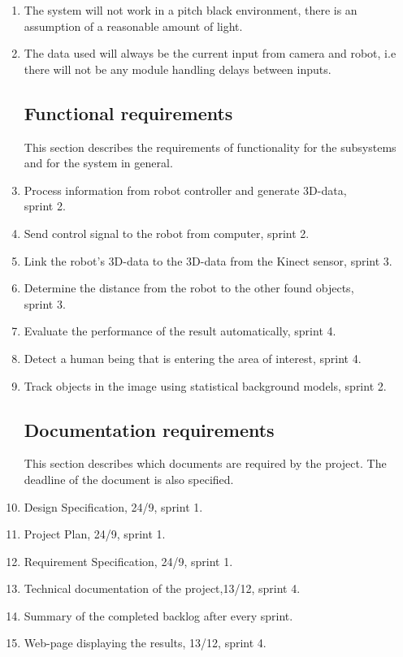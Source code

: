\documentclass[10pt,a4paper]{article}
\begin{document}
\begin{enumerate}
\item The system will not work in a pitch black environment, there is an assumption of a reasonable amount of light.

\item The data used will always be the current input from camera and robot, i.e there will not be any module handling delays between inputs.

\subsection{Functional requirements}
This section describes the requirements of functionality for the subsystems and for the system in general.
\item Process information from robot controller and generate 3D-data, \\sprint 2.
\item Send control signal to the robot from computer, sprint 2.
\item Link the robot's 3D-data to the 3D-data from the Kinect sensor, sprint 3.

\item Determine the distance from the robot to the other found objects, \\sprint 3.

\item Evaluate the performance of the result automatically, sprint 4.

\item Detect a human being that is entering the area of interest, sprint 4.

\item Track objects in the image using statistical background models, sprint 2.

\subsection{Documentation requirements}
This section describes which documents are required by the project. The deadline of the document is also specified.
\item Design Specification, 24/9, sprint 1.
\item Project Plan, 24/9, sprint 1.
\item Requirement Specification, 24/9, sprint 1.
\item Technical documentation of the project,13/12,  sprint 4.
\item Summary of the completed backlog after every sprint.
\item Web-page displaying the results, 13/12, sprint 4.




\end{enumerate}
\end{document}
